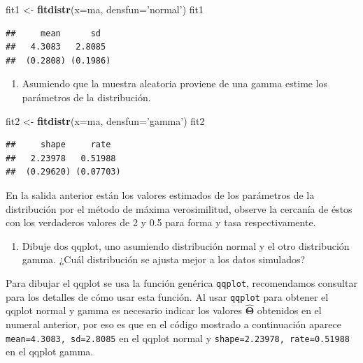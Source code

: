 \documentclass[10pt,]{krantz}
\makeatletter
\newenvironment{Shaded}{\begin{snugshade}}{\end{snugshade}}
\newcommand{\KeywordTok}[1]{\textcolor[rgb]{0.13,0.29,0.53}{\textbf{#1}}}
\newcommand{\DataTypeTok}[1]{\textcolor[rgb]{0.13,0.29,0.53}{#1}}
\newcommand{\StringTok}[1]{\textcolor[rgb]{0.31,0.60,0.02}{#1}}
\newcommand{\NormalTok}[1]{#1}
\providecommand{\tightlist}{%
  \setlength{\itemsep}{0pt}\setlength{\parskip}{0pt}}
\newenvironment{kframe}{%
\medskip{}
\setlength{\fboxsep}{.8em}
 \def\at@end@of@kframe{}%
 \ifinner\ifhmode%
  \def\at@end@of@kframe{\end{minipage}}%
  \begin{minipage}{\columnwidth}%
 \fi\fi%
 \def\FrameCommand##1{\hskip\@totalleftmargin \hskip-\fboxsep
 \colorbox{shadecolor}{##1}\hskip-\fboxsep
     \hskip-\linewidth \hskip-\@totalleftmargin \hskip\columnwidth}%
 \MakeFramed {\advance\hsize-\width
   \@totalleftmargin\z@ \linewidth\hsize
   \@setminipage}}%
 {\par\unskip\endMakeFramed%
 \at@end@of@kframe}
\renewenvironment{Shaded}{\begin{kframe}}{\end{kframe}}
\makeatother
\begin{document}
\begin{Shaded}
\begin{Highlighting}[]
\NormalTok{fit1 <-}\StringTok{ }\KeywordTok{fitdistr}\NormalTok{(}\DataTypeTok{x=}\NormalTok{ma, }\DataTypeTok{densfun=}\StringTok{'normal'}\NormalTok{)}
\NormalTok{fit1}
\end{Highlighting}
\end{Shaded}

\begin{verbatim}
##     mean      sd  
##   4.3083   2.8085 
##  (0.2808) (0.1986)
\end{verbatim}

\begin{enumerate}
\def\labelenumi{\arabic{enumi})}
\setcounter{enumi}{1}
\tightlist
\item
  Asumiendo que la muestra aleatoria proviene de una gamma estime los
  parámetros de la distribución.
\end{enumerate}

\begin{Shaded}
\begin{Highlighting}[]
\NormalTok{fit2 <-}\StringTok{ }\KeywordTok{fitdistr}\NormalTok{(}\DataTypeTok{x=}\NormalTok{ma, }\DataTypeTok{densfun=}\StringTok{'gamma'}\NormalTok{)}
\NormalTok{fit2}
\end{Highlighting}
\end{Shaded}

\begin{verbatim}
##     shape     rate  
##   2.23978   0.51988 
##  (0.29620) (0.07703)
\end{verbatim}

En la salida anterior están los valores estimados de los parámetros de
la distribución por el método de máxima verosimilitud, observe la
cercanía de éstos con los verdaderos valores de 2 y 0.5 para forma y
tasa respectivamente.

\begin{enumerate}
\def\labelenumi{\arabic{enumi})}
\setcounter{enumi}{2}
\tightlist
\item
  Dibuje dos qqplot, uno asumiendo distribución normal y el otro
  distribución gamma. ¿Cuál distribución se ajusta mejor a los datos
  simulados?
\end{enumerate}

Para dibujar el qqplot se usa la función genérica \texttt{qqplot},
recomendamos consultar \citet{hernandez_correa} para los detalles de
cómo usar esta función. Al usar \texttt{qqplot} para obtener el qqplot
normal y gamma es necesario indicar los valores
\(\hat{\boldsymbol{\Theta}}\) obtenidos en el numeral anterior, por eso
es que en el código mostrado a continuación aparece
\texttt{mean=4.3083,\ sd=2.8085} en el qqplot normal y
\texttt{shape=2.23978,\ rate=0.51988} en el qqplot gamma.
\end{document}
